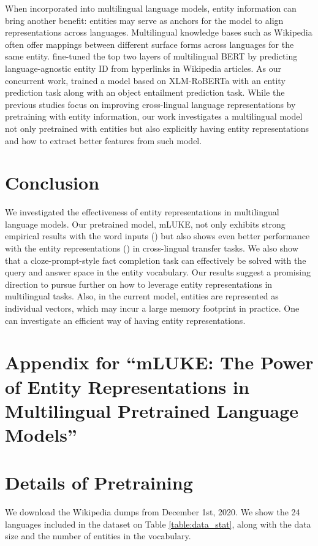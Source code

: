 \documentclass[11pt]{article}
\newcommand{\minisection}[1]{\noindent{\bf {#1}.}}
\newcommand{\papertitle}{mLUKE: The Power of Entity Representations in Multilingual Pretrained Language Models}
\begin{document}
When incorporated into multilingual language models, entity information can bring another benefit: entities may serve as anchors for the model to align representations across languages.
Multilingual knowledge bases such as Wikipedia often offer mappings between different surface forms across languages for the same entity.
\citet{Calixto2021naacl} fine-tuned the top two layers of multilingual BERT by predicting language-agnostic entity ID from hyperlinks in Wikipedia articles.
As our concurrent work, \citet{XLM-K-2021-arxiv} trained a model based on XLM-RoBERTa with an entity prediction task along with an object entailment prediction task.
While the previous studies focus on improving cross-lingual language representations by pretraining with entity information, our work investigates a multilingual model not only pretrained with entities but also explicitly having entity representations and how to extract better features from such model.
 \section{Conclusion}
We investigated the effectiveness of entity representations in multilingual language models.
Our pretrained model, mLUKE, not only exhibits strong empirical results with the word inputs (\mlukeW{}) but also shows even better performance with the entity representations (\mlukeE{}) in cross-lingual transfer tasks.
We also show that a cloze-prompt-style fact completion task can effectively be solved with the query and answer space in the entity vocabulary.
Our results suggest a promising direction to pursue further on how to leverage entity representations in multilingual tasks.
Also, in the current model, entities are represented as individual vectors, which may incur a large memory footprint in practice.
One can investigate an efficient way of having entity representations.
 

 

\appendix
\onecolumn
\section*{Appendix for ``\papertitle{}''}

\section{Details of Pretraining}
\label{appendix:pretraining}

\minisection{Dataset}
We download the Wikipedia dumps from December 1st, 2020.
We show the 24 languages included in the dataset on Table \ref{table:data_stat}, along with the data size and the number of entities in the vocabulary.
\end{document}
